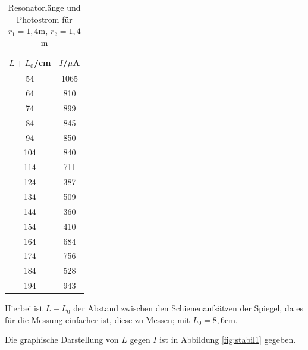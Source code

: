\begin{table}[H]
	\begin{center}
		\begin{tabular}{c c}
			\toprule
			\(L+L_0\)/cm & \(I\)/\(\mu\)A \\
			\midrule
			54          &    1065\\
			64            &  810\\
			74             & 899\\
			84              &845\\
			94              &850\\
			104             &840\\                                                                                    
			114             &711\\                                                                                  
			124             &387\\                                                                                
			134             &509\\                                                                              
			144             &360\\                                                                            
			154             &410\\                                                                          
			164             &684\\                                                                        
			174             &756\\                                                                      
			184             &528\\                                                                    
			194             &943\\
			\bottomrule
		\end{tabular}
		\caption{Resonatorlänge und Photostrom für \(r_1=1,4\)m, \(r_2=1,4\)m}
		\label{tab:t1}
	\end{center}
\end{table}

\noindent Hierbei ist \(L+L_0\) der Abstand zwischen den Schienenaufsätzen der Spiegel, da es für die Messung einfacher ist, diese zu Messen; mit \(L_0=8,6\text{cm}\).

\noindent Die graphische Darstellung von \(L\) gegen \(I\) ist in Abbildung \ref{fig:stabil1} gegeben.

